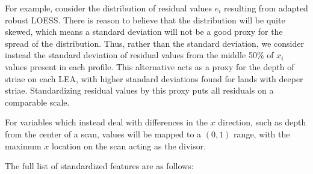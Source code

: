 \documentclass[12pt]{article}
\begin{document}
For example, consider the distribution of residual values \(e_i\)
resulting from adapted robust LOESS. There is reason to believe that the
distribution will be quite skewed, which means a standard deviation will
not be a good proxy for the spread of the distribution. Thus, rather
than the standard deviation, we consider instead the standard deviation
of residual values from the middle 50\% of \(x_i\) values present in
each profile. This alternative acts as a proxy for the depth of striae
on each LEA, with higher standard deviations found for lands with deeper
striae. Standardizing residual values by this proxy puts all residuals
on a comparable scale.

For variables which instead deal with differences in the \(x\)
direction, such as depth from the center of a scan, values will be
mapped to a \((0, 1)\) range, with the maximum \(x\) location on the
scan acting as the divisor.

The full list of standardized features are as follows:
\end{document}

